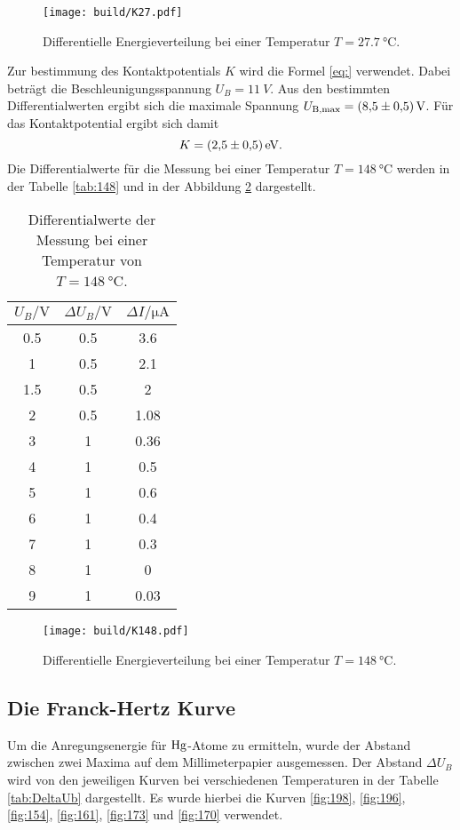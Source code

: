 \begin{figure}[H]
    \centering
    \texttt{[image: build/K27.pdf]}
    \caption{Differentielle Energieverteilung bei einer Temperatur $T = \qty{27.7}{\degreeCelsius}$.}
    \label{fig:K27}
\end{figure}
Zur bestimmung des Kontaktpotentials $K$ wird die Formel \ref{eq:} verwendet.
Dabei beträgt die Beschleunigungsspannung $U_B = \qty{11}{V}$.
Aus den bestimmten Differentialwerten ergibt sich die maximale Spannung $U_\text{B,max} = \qty{8.5 \pm 0.5}{V}$.
Für das Kontaktpotential ergibt sich damit 
\begin{equation*}
    K = \qty{2.5 \pm 0.5}{eV}.
\end{equation*}
Die Differentialwerte für die Messung bei einer Temperatur $T = \qty{148}{\degreeCelsius}$ werden in der Tabelle \ref{tab:148} und in der Abbildung \ref{fig:K148} 
dargestellt.
\begin{table}[H]
    \centering
    \caption{Differentialwerte der Messung bei einer Temperatur von $T = \qty{148}{\degreeCelsius}$.}
    \label{fig:148}
    \begin{tabular}{c c c}
        \toprule
        $U_B / \unit{\volt}$ & $\Delta U_B/\unit{\volt}$ & $\Delta I/\unit{\micro\ampere}$  \\
        \midrule
        0.5 & 0.5  & 3.6\\
        1   & 0.5  & 2.1\\
        1.5 & 0.5  & 2\\
        2   & 0.5  & 1.08\\
        3   & 1    & 0.36\\
        4   & 1    & 0.5\\
        5   & 1    & 0.6\\
        6   & 1    & 0.4\\
        7   & 1  & 0.3\\
        8   & 1  & 0\\
        9   & 1  & 0.03\\
        \bottomrule
    \end{tabular}
\end{table}

\begin{figure}[H]
    \centering
    \texttt{[image: build/K148.pdf]}
    \caption{Differentielle Energieverteilung bei einer Temperatur $T = \qty{148}{\degreeCelsius}$.}
    \label{fig:K148}
\end{figure}

\subsection{Die Franck-Hertz Kurve}
Um die Anregungsenergie für $\ce{Hg}$-Atome zu ermitteln, wurde der Abstand zwischen zwei Maxima auf dem Millimeterpapier ausgemessen.
Der Abstand $\Delta U_B$ wird von den jeweiligen Kurven bei verschiedenen Temperaturen in der Tabelle \ref{tab:DeltaUb} dargestellt.
Es wurde hierbei die Kurven \ref{fig:198}, \ref{fig:196}, \ref{fig:154}, \ref{fig:161}, \ref{fig:173} und \ref{fig:170} verwendet.


